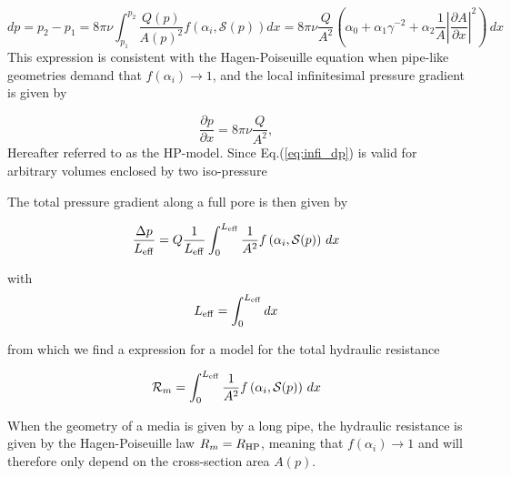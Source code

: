 \documentclass[draft]{agujournal2019}
\begin{document}
\begin{equation}\label{eq:infi_dp}
	dp = p_2- p_1= 8\pi \nu \int_{p_1}^{p_2}\frac{Q(p)}{A(p)^2} f\left(\alpha_i,\mathcal{S}(p)\right) dx= 8 \pi \nu\frac{Q}{A^2}\left(\alpha_0+\alpha_1\gamma^{-2} + \alpha_2 \frac{1}{A}\left|\frac{\partial A}{\partial x}\right|^2\right)\,dx
\end{equation}
This expression is consistent with the Hagen-Poiseuille equation when pipe-like geometries demand that $f(\alpha_i)\rightarrow 1$, and the local infinitesimal pressure gradient is given by 

\begin{equation}\label{eq:HP}
		\frac{\partial p}{\partial x} = 8 \pi \nu\frac{Q}{A^2}, 
\end{equation}
Hereafter referred to as the HP-model. Since  Eq.(\ref{eq:infi_dp}) is valid for arbitrary volumes enclosed by two iso-pressure 



The total pressure gradient along a full pore is then given by

\begin{equation}
	\frac{\Delta p}{L_{\rm{eff}}} =  Q \frac{1}{L_{\rm{eff}}}\int^{L_{\rm{eff}}}_{0}\frac{1}{A^2}f\left(\alpha_i,\mathcal{S}(p)\right)\,dx
\end{equation}

with 
\begin{equation}
	L_{\rm{eff}} = \int^{L_{\rm{eff}}}_{0} dx
\end{equation}

from which we find a expression for a model for the total hydraulic resistance 

\begin{equation}\label{eq:R_model}
	\mathcal{R}_m = \int^{L_{\rm{eff}}}_{0}\frac{1}{A^2}f\left(\alpha_i,\mathcal{S}(p)\right)\,dx
\end{equation}

When the geometry of a media is given by a long pipe, the hydraulic resistance is given by the Hagen-Poiseuille law $R_m = R_{\rm{HP}}$, meaning that $f(\alpha_i)\rightarrow 1$ and will therefore only depend on the cross-section area  $A(p)$.
\end{document}
